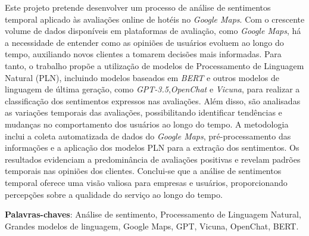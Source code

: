 
\setlength{\absparsep}{18pt} %
\begin{resumo}

Este projeto pretende desenvolver um processo de análise de sentimentos temporal aplicado às avaliações online de hotéis no \textit{Google Maps}. Com o crescente volume de dados disponíveis em plataformas de avaliação, como \textit{Google Maps}, há a necessidade de entender como as opiniões de usuários evoluem ao longo do tempo, auxiliando novos clientes a tomarem decisões mais informadas. Para tanto, o trabalho propõe a utilização de modelos de Processamento de Linguagem Natural (PLN), incluindo modelos baseados em \textit{BERT} e outros modelos de linguagem de última geração, como \textit{GPT-3.5},\textit{OpenChat} e \textit{Vicuna}, para realizar a classificação dos sentimentos expressos nas avaliações. Além disso, são analisadas as variações temporais das avaliações, possibilitando identificar tendências e mudanças no comportamento dos usuários ao longo do tempo. A metodologia inclui a coleta automatizada de dados do \textit{Google Maps}, pré-processamento das informações e a aplicação dos modelos PLN para a extração dos sentimentos. Os resultados evidenciam a predominância de avaliações positivas e revelam padrões temporais nas opiniões dos clientes. Conclui-se que a análise de sentimentos temporal oferece uma visão valiosa para empresas e usuários, proporcionando percepções sobre a qualidade do serviço ao longo do tempo.



 \textbf{Palavras-chaves}: Análise de sentimento, Processamento de Linguagem Natural, Grandes modelos de linguagem, Google Maps, GPT, Vicuna, OpenChat, BERT.
\end{resumo}

